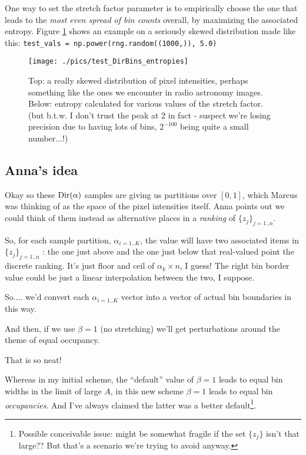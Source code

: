 \documentclass[11pt]{article}
\begin{document}
One way to set the stretch factor parameter is to empirically choose
the one that leads to the {\it most even spread of bin counts}
overall, by maximizing the associated entropy. Figure
\ref{fig:test_entropy} shows an example on a seriously skewed
distribution made like this:
\verb+test_vals = np.power(rng.random((1000,)), 5.0)+

\begin{figure}
\begin{center}
\texttt{[image: ./pics/test\_DirBins\_entropies]}
\caption{\label{fig:test_entropy} Top: a really skewed distribution of
  pixel intensities, perhaps something like the ones we encounter in
  radio astronomy images.  Below: entropy calculated for various
  values of the stretch factor. (but b.t.w. I don't trust the peak at
  2 in fact - suspect we're losing precision due to having lots of
  bins, $2^{-100}$ being quite a small number...!)}
\end{center}
\end{figure}


\subsection{Anna's idea}
Okay so these $\text{Dir}(\alpha)$ samples are giving us partitions over
$[0,1]$, which Marcus was thinking of as the space of the pixel
intensities itself. Anna points out we could think of them instead as
alternative places in a {\it ranking} of $\{z_j\}_{j=1..n}$.

So, for each sample partition, $\alpha_{i=1..K}$, the \kth value will
have two associated items in $\{z_j\}_{j=1..n}$ : the one just above
and the one just below that real-valued point the discrete
ranking. It's just floor and ceil of $\alpha_k \times n$, I guess! The
right bin border value could be just a linear interpolation between
the two, I suppose.

So.... we'd convert each $\alpha_{i=1..K}$ vector into a vector of
actual bin boundaries in this way.

And then, if we use $\beta=1$ (no stretching) we'll get perturbations
around the theme of equal occupancy.

That is so neat!

Whereas in my initial scheme, the ``default'' value of $\beta = 1$
leads to equal bin widths in the limit of large $A$, in this new
scheme $\beta = 1$ leads to equal bin {\it occupancies}. And I've
always claimed the latter was a better default\footnote{Possible
  conceivable issue: might be somewhat fragile if the set $\{z_j\}$
  isn't that large??  But that's a scenario we're trying to avoid
  anyway.}. 
\end{document}
